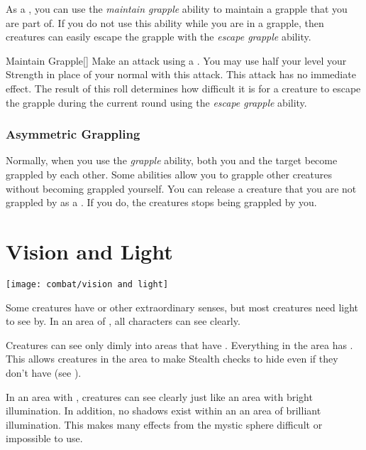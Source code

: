             \label{Maintain Grapple} As a , you can use the \textit{maintain grapple} ability to maintain a grapple that you are part of.
            If you do not use this ability while you are in a grapple, then creatures can easily escape the grapple with the \textit{escape grapple} ability.
            \begin{activeability}{Maintain Grapple}[]
                \rankline
                Make an attack using a .
                You may use half your level \add your Strength in place of your normal  with this attack.
                This attack has no immediate effect.
                The result of this roll determines how difficult it is for a creature to escape the grapple during the current round using the \textit{escape grapple} ability.
            \end{activeability}

        \subsubsection{Asymmetric Grappling}\label{Asymmetric Grappling}
            Normally, when you use the \textit{grapple} ability, both you and the target become grappled by each other.
            Some abilities allow you to grapple other creatures without becoming grappled yourself.
            You can release a creature that you are not grappled by as a .
            If you do, the creatures stops being grappled by you.

\section{Vision and Light}\label{Vision and Light}
    \texttt{[image: combat/vision and light]}

    Some creatures have  or other extraordinary senses, but most creatures need light to see by. 
    In an area of , all characters can see clearly.

    Creatures can see only dimly into areas that have .
    Everything in the area has .
    This allows creatures in the area to make Stealth checks to hide even if they don't have  (see ).

    In an area with , creatures can see clearly just like an area with bright illumination.
    In addition, no shadows exist within an an area of brilliant illumination.
    This makes many effects from the  mystic sphere difficult or impossible to use.


